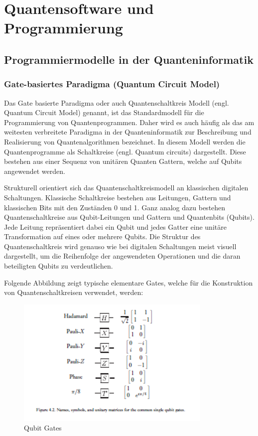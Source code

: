 \chapter{Quantensoftware und Programmierung}
\label{programming} %



\section{Programmiermodelle in der Quanteninformatik}
\label{programming-models}

\subsection{Gate-basiertes Paradigma (Quantum Circuit Model)}
Das Gate basierte Paradigma oder auch Quantenschaltkreis Modell (engl. Quantum Circuit Model) genannt, ist das Standardmodell für die Programmierung von Quantenprogrammen. Daher wird es auch häufig als das am weitesten verbreitete Paradigma in der Quanteninformatik zur Beschreibung und Realisierung von Quantenalgorithmen bezeichnet. In diesem Modell werden die Quantenprogramme als Schaltkreise (engl. Quantum circuits) dargestellt. Diese bestehen aus einer Sequenz von unitären Quanten Gattern, welche auf Qubits angewendet werden. 

Strukturell orientiert sich das Quantenschaltkreismodell an klassischen digitalen Schaltungen. Klassische Schaltkreise bestehen aus Leitungen, Gattern und klassischen Bits mit den Zuständen 0 und 1. Ganz analog dazu bestehen Quantenschaltkreise aus Qubit-Leitungen und Gattern und Quantenbits (Qubits). Jede Leitung repräsentiert dabei ein Qubit und jedes Gatter eine unitäre Transformation auf eines oder mehrere Qubits. Die Struktur des Quantenschaltkreis wird genauso wie bei digitalen Schaltungen meist visuell dargestellt, um die Reihenfolge der angewendeten Operationen und die daran beteiligten Qubits zu verdeutlichen. 

Folgende Abbildung zeigt typische elementare Gates, welche für die Konstruktion von Quantenschaltkreisen verwendet, werden: 
\begin{figure}
    \centering
    \includegraphics[width=0.5\linewidth]{Qubit Gates.png}
    \caption{Qubit Gates}
    \label{fig:enter-label}
\end{figure}

